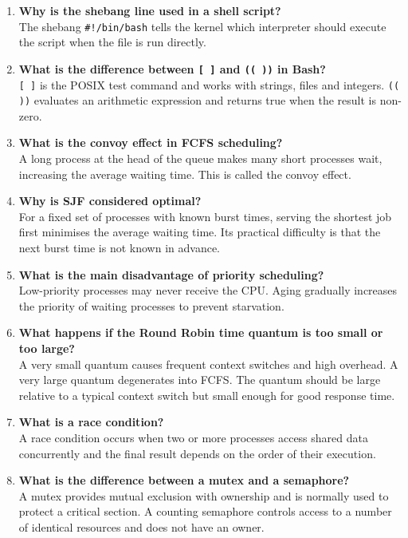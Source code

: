 \begin{enumerate}
    \item \textbf{Why is the shebang line used in a shell script?}\\
    The shebang \texttt{\#!/bin/bash} tells the kernel which interpreter should execute the script when the file is run directly.

    \item \textbf{What is the difference between \texttt{[ ]} and \texttt{(( ))} in Bash?}\\
    \texttt{[ ]} is the POSIX test command and works with strings, files and integers. \texttt{(( ))} evaluates an arithmetic expression and returns true when the result is non-zero.

    \item \textbf{What is the convoy effect in FCFS scheduling?}\\
    A long process at the head of the queue makes many short processes wait, increasing the average waiting time. This is called the convoy effect.

    \item \textbf{Why is SJF considered optimal?}\\
    For a fixed set of processes with known burst times, serving the shortest job first minimises the average waiting time. Its practical difficulty is that the next burst time is not known in advance.

    \item \textbf{What is the main disadvantage of priority scheduling?}\\
    Low-priority processes may never receive the CPU. Aging gradually increases the priority of waiting processes to prevent starvation.

    \item \textbf{What happens if the Round Robin time quantum is too small or too large?}\\
    A very small quantum causes frequent context switches and high overhead. A very large quantum degenerates into FCFS. The quantum should be large relative to a typical context switch but small enough for good response time.

    \item \textbf{What is a race condition?}\\
    A race condition occurs when two or more processes access shared data concurrently and the final result depends on the order of their execution.

    \item \textbf{What is the difference between a mutex and a semaphore?}\\
    A mutex provides mutual exclusion with ownership and is normally used to protect a critical section. A counting semaphore controls access to a number of identical resources and does not have an owner.


\end{enumerate}
